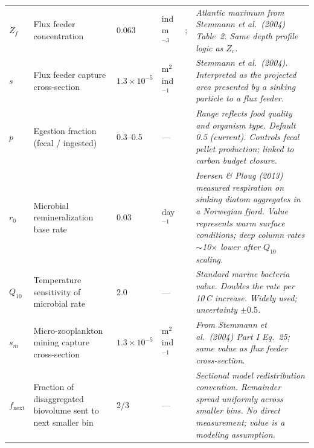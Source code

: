\documentclass[11pt,a4paper]{article}
\newcommand{\conf}[1]{\textit{#1}}
\begin{document}
\begin{longtable}{L{2cm} L{5.5cm} C{3cm} L{3.5cm} L{5cm} L{6cm}}
$Z_f$ &
Flux feeder concentration &
0.063 &
ind\,m$^{-3}$ &
\citet{stemmann2004a}; \citet{stemmann2004b} &
\conf{Atlantic maximum from Stemmann et al.\ (2004) Table~2. Same depth profile logic as $Z_c$.} \\[4pt]

$s$ &
Flux feeder capture cross-section &
$1.3\times10^{-5}$ &
m$^{2}$\,ind$^{-1}$ &
\citet{stemmann2004a} &
\conf{Stemmann et al.\ (2004). Interpreted as the projected area presented by a sinking particle to a flux feeder.} \\[4pt]

$p$ &
Egestion fraction (fecal / ingested) &
0.3--0.5 &
--- &
\citet{stemmann2004a} &
\conf{Range reflects food quality and organism type. Default 0.5 (current). Controls fecal pellet production; linked to carbon budget closure.} \\[4pt]

$r_0$ &
Microbial remineralization base rate &
0.03 &
day$^{-1}$ &
\citet{iversen2013} &
\conf{Iversen \& Ploug (2013) measured respiration on sinking diatom aggregates in a Norwegian fjord. Value represents warm surface conditions; deep column rates $\sim$10$\times$ lower after $Q_{10}$ scaling.} \\[4pt]

$Q_{10}$ &
Temperature sensitivity of microbial rate &
2.0 &
--- &
\citet{iversen2013} &
\conf{Standard marine bacteria value. Doubles the rate per 10\,\textdegree C increase. Widely used; uncertainty $\pm0.5$.} \\[4pt]

$s_m$ &
Micro-zooplankton mining capture cross-section &
$1.3\times10^{-5}$ &
m$^{2}$\,ind$^{-1}$ &
\citet{stemmann2004a} &
\conf{From Stemmann et al.\ (2004) Part I Eq.~25; same value as flux feeder cross-section.} \\[4pt]

$f_\mathrm{next}$ &
Fraction of disaggregated biovolume sent to next smaller bin &
2/3 &
--- &
\citet{burd2009} &
\conf{Sectional model redistribution convention. Remainder spread uniformly across smaller bins. No direct measurement; value is a modeling assumption.} \\[4pt]

\end{longtable}

\clearpage

\end{document}
